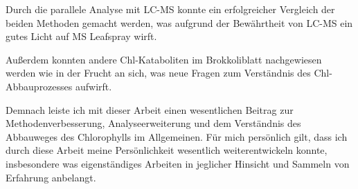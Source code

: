 Durch die parallele Analyse mit LC-MS konnte ein erfolgreicher Vergleich der beiden Methoden gemacht werden, was aufgrund der Bewährtheit von LC-MS ein gutes Licht auf MS Leafspray wirft.

Außerdem konnten andere Chl-Kataboliten im Brokkoliblatt nachgewiesen werden wie in der Frucht an sich, was neue Fragen zum Verständnis des Chl-Abbauprozesses aufwirft.

Demnach leiste ich mit dieser Arbeit einen wesentlichen Beitrag zur Methodenverbesserung, Analyseerweiterung und dem Verständnis des Abbauweges des Chlorophylls im Allgemeinen. Für mich persönlich gilt, dass ich durch diese Arbeit meine Persönlichkeit wesentlich weiterentwickeln konnte, insbesondere was eigenständiges Arbeiten in jeglicher Hinsicht und Sammeln von Erfahrung anbelangt. 

